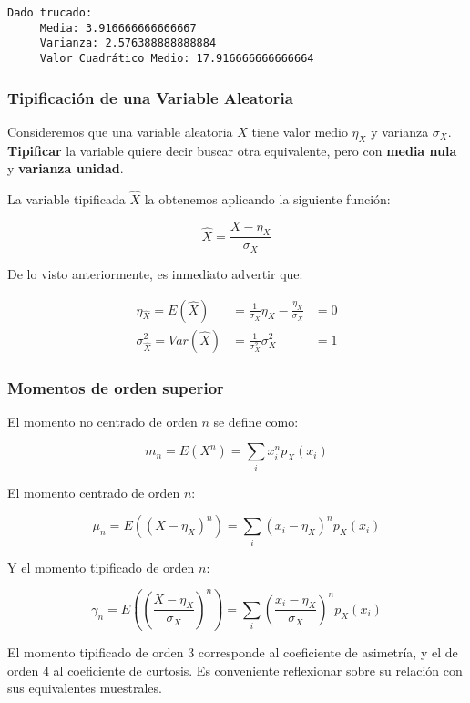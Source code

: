 \documentclass[11pt]{article}
\begin{document}
    \begin{Verbatim}[commandchars=\\\{\}]
Dado trucado:
	 Media: 3.916666666666667
	 Varianza: 2.576388888888884
	 Valor Cuadrático Medio: 17.916666666666664

    \end{Verbatim}

    \hypertarget{tipificaciuxf3n-de-una-variable-aleatoria}{%
\subsubsection*{Tipificación de una Variable
Aleatoria}\label{tipificaciuxf3n-de-una-variable-aleatoria}}

Consideremos que una variable aleatoria \(X\) tiene valor medio
\(\eta_X\) y varianza \(\sigma_X\). \textbf{Tipificar} la variable
quiere decir buscar otra equivalente, pero con \textbf{media nula} y
\textbf{varianza unidad}.

La variable tipificada \(\hat X\) la obtenemos aplicando la siguiente
función:

\[\hat X = \frac{X-\eta_X}{\sigma_X}\]

De lo visto anteriormente, es inmediato advertir que:

\begin{align*}
\eta_{\hat X}= E(\hat X) &= \frac{1}{\sigma_X}\eta_X-\frac{\eta_X}{\sigma_X}&=0 \\
\sigma_{\hat X}^2 = Var(\hat X) &=\frac{1}{\sigma_X^2}\sigma_X^2 &= 1 
\end{align*}

    \hypertarget{momentos-de-orden-superior}{%
\subsubsection*{Momentos de orden
superior}\label{momentos-de-orden-superior}}

El momento no centrado de orden \(n\) se define como:

\[m_n =E(X^n)=\sum_i x_i^np_X(x_i)\]

El momento centrado de orden \(n\):

\[\mu_n =E((X-\eta_X)^n)=\sum_i (x_i-\eta_X)^np_X(x_i)\]

Y el momento tipificado de orden \(n\):

\[\gamma_n =E(\left(\frac{X-\eta_X}{\sigma_X}\right)^n)=\sum_i \left(\frac{x_i-\eta_X}{\sigma_X}\right)^np_X(x_i)\]

El momento tipificado de orden 3 corresponde al coeficiente de
asimetría, y el de orden 4 al coeficiente de curtosis. Es conveniente
reflexionar sobre su relación con sus equivalentes muestrales.
\end{document}
